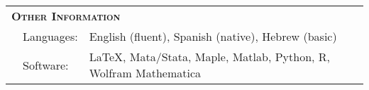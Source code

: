 \begin{tabular}{lll}
	
	\multicolumn{3}{l}{
		\large
		\textbf{%
			\textsc{%
				Other Information
			}
		}
	}
	\\[2ex]
	
	  \indent
	& Languages:
	& English (fluent), Spanish (native), Hebrew (basic)
	\\[.5ex]
	
	& Software:
	& \LaTeX, Mata/Stata, Maple, Matlab, Python, R, Wolfram Mathematica
	\\[.5ex]
		
\end{tabular}
